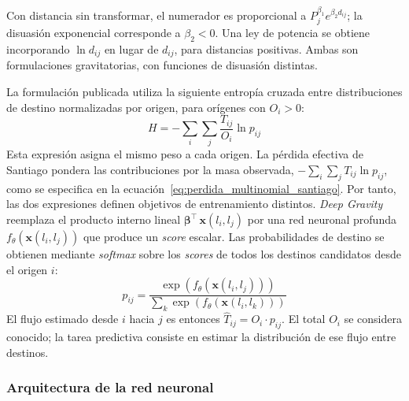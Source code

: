 Con distancia sin transformar, el numerador es proporcional a $P_j^{\beta_1}e^{\beta_2 d_{ij}}$; la disuasión exponencial corresponde a $\beta_2<0$. Una ley de potencia se obtiene incorporando $\ln d_{ij}$ en lugar de $d_{ij}$, para distancias positivas. Ambas son formulaciones gravitatorias, con funciones de disuasión distintas.

La formulación publicada utiliza la siguiente entropía cruzada entre distribuciones de destino normalizadas por origen, para orígenes con $O_i>0$:
\begin{equation}
    H = -\sum_i \sum_j \frac{T_{ij}}{O_i} \ln p_{ij}
    \label{eq:dg_loss}
\end{equation}
Esta expresión asigna el mismo peso a cada origen. La pérdida efectiva de Santiago pondera las contribuciones por la masa observada, $-\sum_i\sum_j T_{ij}\ln p_{ij}$, como se especifica en la ecuación~\eqref{eq:perdida_multinomial_santiago}. Por tanto, las dos expresiones definen objetivos de entrenamiento distintos.
\textit{Deep Gravity} reemplaza el producto interno lineal $\boldsymbol{\beta}^{\top}\,\mathbf{x}(l_i, l_j)$ por una red neuronal profunda $f_\theta(\mathbf{x}(l_i, l_j))$ que produce un \textit{score} escalar. Las probabilidades de destino se obtienen mediante \textit{softmax} sobre los \textit{scores} de todos los destinos candidatos desde el origen $i$:
\begin{equation}
    p_{ij} = \frac{\exp\!\left(f_\theta\!\left(\mathbf{x}(l_i, l_j)\right)\right)}{\displaystyle\sum_{k} \exp\!\left(f_\theta\!\left(\mathbf{x}(l_i, l_k)\right)\right)}
    \label{eq:dg_softmax}
\end{equation}
El flujo estimado desde $i$ hacia $j$ es entonces $\hat{T}_{ij} = O_i \cdot p_{ij}$. El total $O_i$ se considera conocido; la tarea predictiva consiste en estimar la distribución de ese flujo entre destinos.

\subsubsection{Arquitectura de la red neuronal}

